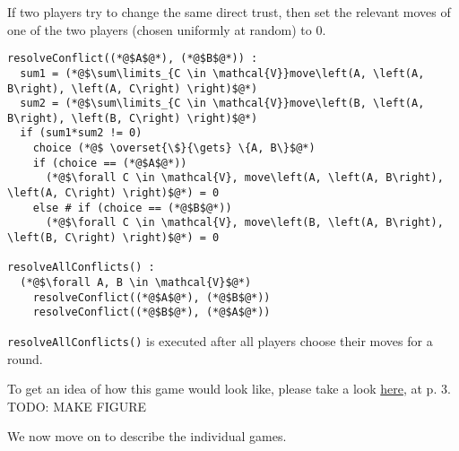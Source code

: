  If two players try to change the same direct trust, then set the relevant moves of one of the two players (chosen uniformly
  at random) to 0.
  \begin{lstlisting}[label=conflict, style=numbers]
resolveConflict((*@$A$@*), (*@$B$@*)) :
  sum1 = (*@$\sum\limits_{C \in \mathcal{V}}move\left(A, \left(A, B\right), \left(A, C\right) \right)$@*)
  sum2 = (*@$\sum\limits_{C \in \mathcal{V}}move\left(B, \left(A, B\right), \left(B, C\right) \right)$@*)
  if (sum1*sum2 != 0)
    choice (*@$ \overset{\$}{\gets} \{A, B\}$@*)
    if (choice == (*@$A$@*))
      (*@$\forall C \in \mathcal{V}, move\left(A, \left(A, B\right), \left(A, C\right) \right)$@*) = 0
    else # if (choice == (*@$B$@*))
      (*@$\forall C \in \mathcal{V}, move\left(B, \left(A, B\right), \left(B, C\right) \right)$@*) = 0

resolveAllConflicts() :
  (*@$\forall A, B \in \mathcal{V}$@*)
    resolveConflict((*@$A$@*), (*@$B$@*))
    resolveConflict((*@$B$@*), (*@$A$@*))
  \end{lstlisting}

  \noindent \texttt{resolveAllConflicts()} is executed after all players choose their moves for a round.

  \noindent To get an idea of how this game would look like, please take a look
  \href{http://www.agsm.edu.au/bobm/teaching/SGTM/lect06pr-3.pdf}{here}, at p. 3.
  TODO: MAKE FIGURE
  
  \noindent We now move on to describe the individual games.
